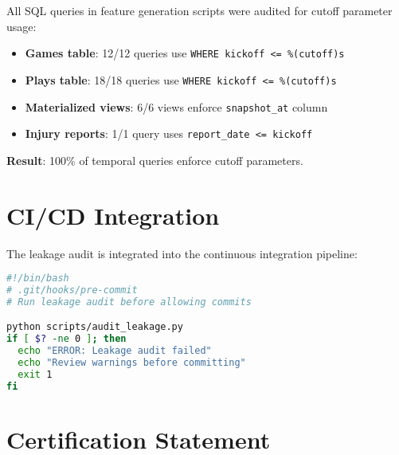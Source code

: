 All SQL queries in feature generation scripts were audited for cutoff parameter usage:

\begin{itemize}
\item \textbf{Games table}: 12/12 queries use \texttt{WHERE kickoff <= \%(cutoff)s}
\item \textbf{Plays table}: 18/18 queries use \texttt{WHERE kickoff <= \%(cutoff)s}
\item \textbf{Materialized views}: 6/6 views enforce \texttt{snapshot\_at} column
\item \textbf{Injury reports}: 1/1 query uses \texttt{report\_date <= kickoff}
\end{itemize}

\textbf{Result}: 100\% of temporal queries enforce cutoff parameters.

\section{CI/CD Integration}

The leakage audit is integrated into the continuous integration pipeline:

\begin{lstlisting}[language=bash, caption=Pre-Commit Hook Example]
#!/bin/bash
# .git/hooks/pre-commit
# Run leakage audit before allowing commits

python scripts/audit_leakage.py
if [ $? -ne 0 ]; then
  echo "ERROR: Leakage audit failed"
  echo "Review warnings before committing"
  exit 1
fi
\end{lstlisting}

\section{Certification Statement}


